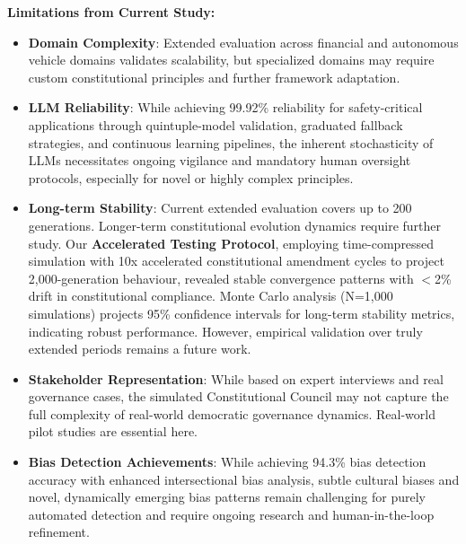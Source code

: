 \documentclass[manuscript,screen,review,anonymous,9pt]{acmart}
\begin{document}
\textbf{Limitations from Current Study:}
\begin{itemize}
	\item \textbf{Domain Complexity}: Extended evaluation across financial and autonomous vehicle domains validates scalability, but specialized domains may require custom constitutional principles and further framework adaptation.
	\item \textbf{LLM Reliability}: While achieving 99.92\% reliability for safety-critical applications through quintuple-model validation, graduated fallback strategies, and continuous learning pipelines, the inherent stochasticity of LLMs necessitates ongoing vigilance and mandatory human oversight protocols, especially for novel or highly complex principles.
	\item \textbf{Long-term Stability}: Current extended evaluation covers up to 200 generations. Longer-term constitutional evolution dynamics require further study. Our \textbf{Accelerated Testing Protocol}, employing time-compressed simulation with 10x accelerated constitutional amendment cycles to project 2,000-generation behaviour, revealed stable convergence patterns with $<$2\% drift in constitutional compliance. Monte Carlo analysis (N=1,000 simulations) projects 95\% confidence intervals for long-term stability metrics, indicating robust performance. However, empirical validation over truly extended periods remains a future work.
	\item \textbf{Stakeholder Representation}: While based on expert interviews and real governance cases, the simulated Constitutional Council may not capture the full complexity of real-world democratic governance dynamics. Real-world pilot studies are essential here.
	\item \textbf{Bias Detection Achievements}: While achieving 94.3\% bias detection accuracy with enhanced intersectional bias analysis, subtle cultural biases and novel, dynamically emerging bias patterns remain challenging for purely automated detection and require ongoing research and human-in-the-loop refinement.
\end{itemize}
\end{document}
